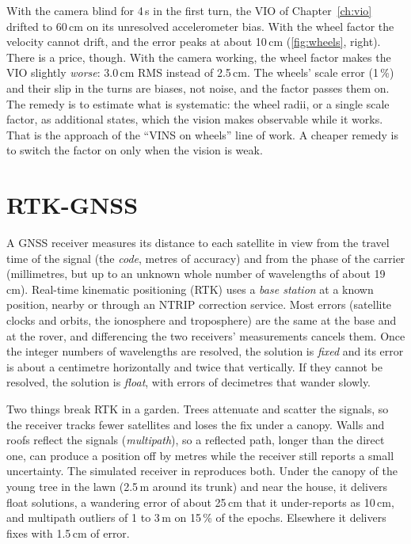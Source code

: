 With the camera blind for 4\,s in the first turn, the VIO of
Chapter~\ref{ch:vio} drifted to 60\,cm on its unresolved accelerometer
bias. With the wheel factor the velocity cannot drift, and the error
peaks at about 10\,cm (\cref{fig:wheels}, right). There is a price,
though. With the camera working, the wheel factor makes the VIO slightly
\emph{worse}: 3.0\,cm RMS instead of 2.5\,cm. The wheels' scale error
(1\,\%) and their slip in the turns are biases, not noise, and the
factor passes them on. The remedy is to estimate what is systematic:
the wheel radii, or a single scale factor, as additional states, which
the vision makes observable while it works. That is the approach of the
``VINS on wheels'' line of work. A cheaper remedy is to switch the
factor on only when the vision is weak.

\section{RTK-GNSS}

A GNSS receiver measures its distance to each satellite in view from
the travel time of the signal (the \emph{code}, metres of accuracy) and
from the phase of the carrier (millimetres, but up to an unknown whole
number of wavelengths of about 19\,cm). Real-time kinematic positioning
(RTK) uses a \emph{base station} at a known position, nearby or through
an NTRIP correction service. Most errors (satellite clocks and orbits,
the ionosphere and troposphere) are the same at the base and at the
rover, and differencing the two receivers' measurements cancels them.
Once the integer numbers of wavelengths are resolved, the solution is
\emph{fixed} and its error is about a centimetre horizontally and twice
that vertically. If they cannot be resolved, the solution is
\emph{float}, with errors of decimetres that wander slowly.

Two things break RTK in a garden. Trees attenuate and scatter the
signals, so the receiver tracks fewer satellites and loses the fix under
a canopy. Walls and roofs reflect the signals (\emph{multipath}), so a
reflected path, longer than the direct one, can produce a position off
by metres while the receiver still reports a small uncertainty. The
simulated receiver in  reproduces both. Under
the canopy of the young tree in the lawn (2.5\,m around its trunk) and
near the house, it delivers float solutions, a wandering error of about
25\,cm that it under-reports as 10\,cm, and multipath outliers of 1 to
3\,m on 15\,\% of the epochs. Elsewhere it delivers fixes with 1.5\,cm
of error.

